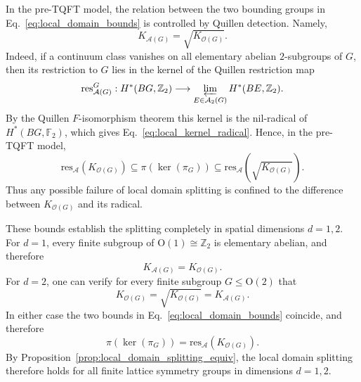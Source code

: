 \documentclass[aps,prx,reprint,superscriptaddress,twocolumn,amsmath,amssymb,amsfonts, nofootinbib]{revtex4-2}
\newcommand{\res}{\text{res}}
\theoremstyle{apsstyle}
\begin{document}
\bigskip 

In the pre-TQFT model, the relation between the two bounding groups in
Eq.~\ref{eq:local_domain_bounds} is controlled by Quillen detection. Namely,
\begin{equation}
    K_{\mathcal A(G)}
    =
    \sqrt{K_{\mathcal O(G)}}.
    \label{eq:local_kernel_radical}
\end{equation}
Indeed, if a continuum class vanishes on all elementary abelian $2$-subgroups of $G$, then its restriction to $G$ lies in the kernel of the Quillen restriction map
\begin{equation*}
    \res^G_{\mathcal A(G)}:
    H^*(BG,\mathbb Z_2)
    \longrightarrow
    \varprojlim_{E\in\mathcal A_2(G)}
    H^*(BE,\mathbb Z_2).
\end{equation*}
By the Quillen $F$-isomorphism theorem this kernel is the nil-radical of
$H^*(BG,\mathbb F_2)$, which gives Eq.~\ref{eq:local_kernel_radical}. Hence, in the pre-TQFT model,
\begin{equation}
    \res_{\mathcal A}(K_{\mathcal O(G)})
    \subseteq
    \pi(\ker(\pi_G))
    \subseteq
    \res_{\mathcal A}\!\left(
        \sqrt{K_{\mathcal O(G)}}
    \right).
    \label{eq:local_domain_radical_bounds}
\end{equation}
Thus any possible failure of local domain splitting is confined to the difference between $K_{\mathcal O(G)}$ and its radical.


\noindent These bounds establish the splitting completely in spatial dimensions
$d=1,2$. For $d=1$, every finite subgroup of $\mathrm{O}(1)\cong\mathbb Z_2$ is elementary abelian, and therefore
\begin{equation*}
    K_{\mathcal A(G)}=K_{\mathcal O(G)}.
\end{equation*}
For $d=2$, one can verify for every finite subgroup
$G\leq\mathrm{O}(2)$ that
\begin{equation}
    K_{\mathcal O(G)}
    =
    \sqrt{K_{\mathcal O(G)}}
    =
    K_{\mathcal A(G)}.
    \label{eq:dim2_local_kernel_radical}
\end{equation}
In either case the two bounds in Eq.~\ref{eq:local_domain_bounds} coincide, and therefore
\begin{equation}
    \pi(\ker(\pi_G))
    =
    \res_{\mathcal A}(K_{\mathcal O(G)}).
    \label{eq:low_dim_local_domain_splitting}
\end{equation}
By Proposition~\ref{prop:local_domain_splitting_equiv}, the local domain splitting therefore holds for all finite lattice symmetry groups in dimensions $d=1,2$.
\end{document}
